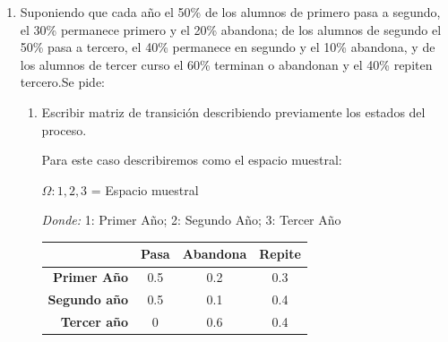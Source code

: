 \documentclass{templateNote}
\begin{document}
\begin{enumerate}
    \item Suponiendo que cada año el 50\% de los alumnos de primero pasa a segundo, el 30\% permanece primero y el 20\% abandona; de los alumnos de segundo el 50\% pasa a tercero, el 40\% permanece en segundo y el 10\% abandona, y de los alumnos de tercer curso el 60\% terminan o abandonan y el 40\% repiten tercero.Se pide:
    \begin{enumerate}[label=\alph*)]
        \item Escribir matriz de transición describiendo previamente los estados del proceso.
        
        Para este caso describiremos como el espacio muestral:
        \begin{center}
            $\Omega: {1,2,3}$ = Espacio muestral\\
        \end{center}
        \textit{Donde:}
        1: Primer Año; 2: Segundo Año; 3: Tercer Año

        \begin{table}[h]
            \centering
            \begin{tabular}{|r|c|c|c|}
            \hline
                                 & \textbf{Pasa}   & \textbf{Abandona}  & \textbf{Repite} \\ \hline
            \textbf{Primer Año } & 0.5             & 0.2                & 0.3 \\ 
            \textbf{Segundo año} & 0.5             & 0.1                & 0.4 \\ 
            \textbf{Tercer año } & 0               & 0.6                & 0.4 \\ \hline
            \end{tabular}
        \end{table}


\end{enumerate}
\end{enumerate}
\end{document}
